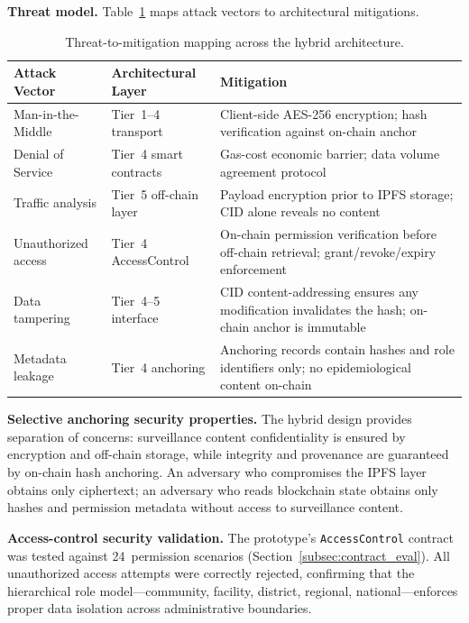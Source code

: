 \documentclass[AMA,LATO1COL]{WileyNJD-v2}
\begin{document}
\textbf{Threat model.} Table~\ref{tab:threats_eval} maps attack vectors to architectural mitigations.

\begin{table}[!ht]
\caption{Threat-to-mitigation mapping across the hybrid architecture.}\label{tab:threats_eval}
\centering
\small
\begin{tabular}{p{2.2cm}p{2.5cm}p{2.8cm}}
\toprule
\textbf{Attack Vector} & \textbf{Architectural Layer} & \textbf{Mitigation} \\
\midrule
Man-in-the-Middle & Tier~1--4 transport & Client-side AES-256 encryption; hash verification against on-chain anchor \\
\midrule
Denial of Service & Tier~4 smart contracts & Gas-cost economic barrier; data volume agreement protocol \\
\midrule
Traffic analysis & Tier~5 off-chain layer & Payload encryption prior to IPFS storage; CID alone reveals no content \\
\midrule
Unauthorized access & Tier~4 AccessControl & On-chain permission verification before off-chain retrieval; grant/revoke/expiry enforcement \\
\midrule
Data tampering & Tier~4--5 interface & CID content-addressing ensures any modification invalidates the hash; on-chain anchor is immutable \\
\midrule
Metadata leakage & Tier~4 anchoring & Anchoring records contain hashes and role identifiers only; no epidemiological content on-chain \\
\bottomrule
\end{tabular}
\end{table}

\textbf{Selective anchoring security properties.} The hybrid design provides separation of concerns: surveillance content confidentiality is ensured by encryption and off-chain storage, while integrity and provenance are guaranteed by on-chain hash anchoring. An adversary who compromises the IPFS layer obtains only ciphertext; an adversary who reads blockchain state obtains only hashes and permission metadata without access to surveillance content.

\textbf{Access-control security validation.} The prototype's \texttt{AccessControl} contract was tested against 24~permission scenarios (Section~\ref{subsec:contract_eval}). All unauthorized access attempts were correctly rejected, confirming that the hierarchical role model---community, facility, district, regional, national---enforces proper data isolation across administrative boundaries.
\end{document}
